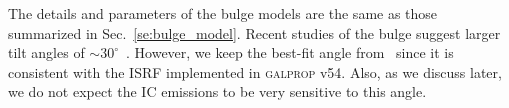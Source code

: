 \documentclass[doublespace,nopageskip]{VTthesis} %
\begin{document}
The details and parameters of the bulge models are the same as those summarized in Sec.~\ref{se:bulge_model}. Recent studies of the bulge suggest larger tilt angles of $\sim 30^\circ$~\cite{2013MNRAS.434..595C,2017MNRAS.465.1621P}. However, we keep the best-fit angle from~\citet{1998ApJ...492..495F} since it is consistent with the ISRF implemented in \textsc{galprop} v54. Also, as we discuss later, we do not expect the IC emissions to be very sensitive to this angle.



\end{document}
